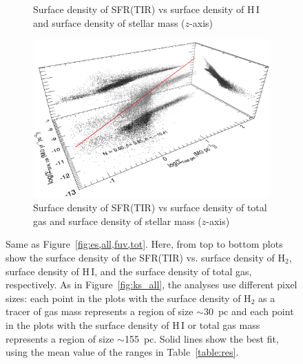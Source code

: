 {\begin{figure}
\begin{subfigure}[b]{0.5\textwidth}
        \caption{Surface density of SFR(TIR) vs surface density of H\,{\sc I} and surface density of stellar mass ($z$-axis) }
        \label{fig:es,all,fir,hi}
    \end{subfigure}
    \hfill
   \begin{subfigure}[b]{0.5\textwidth}
        \centering
        \includegraphics[width=\textwidth]{../image_paper1/es_tot_fir_vs_tot2_f.png}
        \caption{Surface density of SFR(TIR) vs surface density of total gas and surface density of stellar mass ($z$-axis)}
        \label{fig:es,all,fir,tot}
    \end{subfigure}
       \caption{Same as Figure~\ref{fig:es,all,fuv,tot}. Here, from top to bottom plots show the surface density of the SFR(TIR) vs. surface density of H$_2$, surface density of H\,{\sc I}, and the surface density of total gas, respectively. As in Figure~\ref{fig:ks_all}, the analyses use different pixel sizes: each point in the plots with the surface density of H$_2$ as a tracer of gas mass represents a region of size $\sim$30~pc and each point in the plots with the surface density of H\,{\sc I} or total gas mass represents a region of size $\sim$155~pc. Solid lines show the best fit, using the mean value of the ranges in Table~\ref{table:res}.}
       \label{fig:es,fir}
\end{figure}


}
